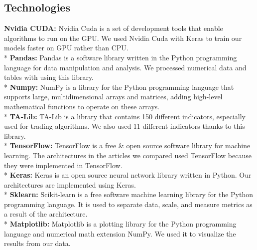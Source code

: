 \documentclass{article}
\begin{document}
\subsection{Technologies}
\textbf{Nvidia CUDA:} Nvidia Cuda is a set of development tools that enable algorithms to run on the GPU. We used Nvidia Cuda with Keras to train our models faster on GPU rather than CPU.\vspace{0.1cm}\\*
\textbf{Pandas:} Pandas is a software library written in the Python programming language for data manipulation and analysis. We processed numerical data and tables with using this library.\vspace{0.1cm}\\*
\textbf{Numpy:} NumPy is a library for the Python programming language that supports large, multidimensional arrays and matrices, adding high-level mathematical functions to operate on these arrays.\vspace{0.1cm}\\*
\textbf{TA-Lib:} TA-Lib is a library that contains 150 different indicators, especially used for trading algorithms. We also used 11 different indicators thanks to this library.\vspace{0.1cm}\\*
\textbf{TensorFlow:} TensorFlow is a free \& open source software library for machine learning. The architectures in the articles we compared used TensorFlow because they were implemented in TensorFlow.\vspace{0.1cm}\\*
\textbf{Keras:} Keras is an open source neural network library written in Python. Our architectures are implemented using Keras.\vspace{0.1cm}\\*
\textbf{Sklearn:} Scikit-learn is a free software machine learning library for the Python programming language. It is used to separate data, scale, and measure metrics as a result of the architecture.\vspace{0.1cm}\\*
\textbf{Matplotlib:} Matplotlib is a plotting library for the Python programming language and numerical math extension NumPy. We used it to visualize the results from our data.\vspace{0.5cm}
\end{document}

